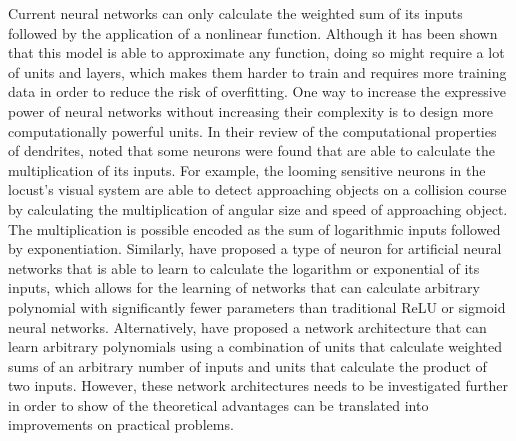 Current neural networks can only calculate the weighted sum of its inputs
followed by the application of a nonlinear function. Although it has been shown
that this model is able to approximate any function, doing so might require a
lot of units and layers, which makes them harder to train and requires more
training data in order to reduce the risk of overfitting. One way to increase
the expressive power of neural networks without increasing their complexity is
to design more computationally powerful units. In their review of the
computational properties of dendrites, \citet{london2005} noted that some
neurons were found that are able to calculate the multiplication of its inputs.
For example, the looming sensitive neurons in the locust's visual system are
able to detect approaching objects on a collision course by calculating the
multiplication of angular size and speed of approaching object. The
multiplication is possible encoded as the sum of logarithmic inputs followed by
exponentiation. Similarly, \citet{godfrey2016} have proposed a type of neuron
for artificial neural networks that is able to learn to calculate the logarithm
or exponential of its inputs, which allows for the learning of networks that can
calculate arbitrary polynomial with significantly fewer parameters than
traditional ReLU or sigmoid neural networks. Alternatively, \citet{livni2013}
have proposed a network architecture that can learn arbitrary polynomials using
a combination of units that calculate weighted sums of an arbitrary number of
inputs and units that calculate the product of two inputs. However, these
network architectures needs to be investigated further in order to show of the
theoretical advantages can be translated into improvements on practical
problems.
